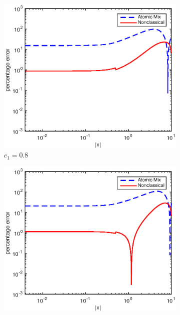 \documentclass[12pt]{article}
\begin{document}
{\begin{figure}[p]
\begin{subfigure}{0.495\textwidth}
        \label{figerrE70}
    \end{subfigure}
    \\
    \centering
    \begin{subfigure}{0.495\textwidth}
        \centering
        \includegraphics[width=\textwidth]{NSE_err_E80.eps}
        \caption{$c_1 = 0.8$}
        \label{figerrE80}
    \end{subfigure}
    \hfill
    \begin{subfigure}{0.495\textwidth}
        \centering
        \includegraphics[width=\textwidth]{NSE_err_E90.eps}

\end{subfigure}
\end{figure}}
\end{document}
